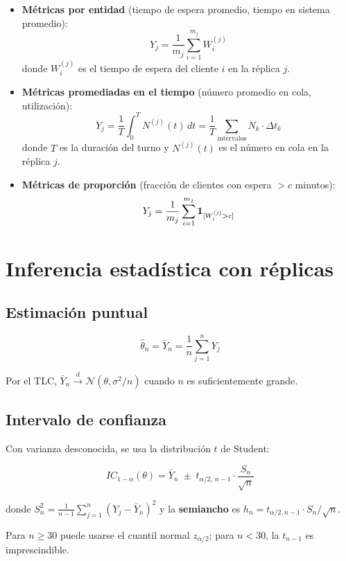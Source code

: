 \documentclass[11pt, letterpaper]{article}
\begin{document}
\begin{itemize}
    \item \textbf{Métricas por entidad} (tiempo de espera promedio, tiempo en sistema promedio):
    \[
    Y_j = \frac{1}{m_j}\sum_{i=1}^{m_j} W_i^{(j)}
    \]
    donde $W_i^{(j)}$ es el tiempo de espera del cliente $i$ en la réplica $j$.

    \item \textbf{Métricas promediadas en el tiempo} (número promedio en cola, utilización):
    \[
    Y_j = \frac{1}{T}\int_0^T N^{(j)}(t)\,dt = \frac{1}{T}\sum_{\text{intervalos}} N_k \cdot \Delta t_k
    \]
    donde $T$ es la duración del turno y $N^{(j)}(t)$ es el número en cola en la réplica $j$.

    \item \textbf{Métricas de proporción} (fracción de clientes con espera $> c$ minutos):
    \[
    Y_j = \frac{1}{m_j}\sum_{i=1}^{m_j}\mathbf{1}_{[W_i^{(j)} > c]}
    \]
\end{itemize}

\section{Inferencia estadística con réplicas}

\subsection{Estimación puntual}

\[
\hat\theta_n = \bar Y_n = \frac{1}{n}\sum_{j=1}^n Y_j
\]

Por el TLC, $\bar Y_n \xrightarrow{d} \mathcal{N}(\theta, \sigma^2/n)$ cuando $n$ es suficientemente grande.

\subsection{Intervalo de confianza}

Con varianza desconocida, se usa la distribución $t$ de Student:

\[
\boxed{IC_{1-\alpha}(\theta) = \bar Y_n \;\pm\; t_{\alpha/2,\,n-1}\cdot\frac{S_n}{\sqrt{n}}}
\]

donde $S_n^2 = \frac{1}{n-1}\sum_{j=1}^n(Y_j - \bar Y_n)^2$ y la \textbf{semiancho} es $h_n = t_{\alpha/2,n-1}\cdot S_n/\sqrt{n}$.

Para $n \ge 30$ puede usarse el cuantil normal $z_{\alpha/2}$; para $n < 30$, la $t_{n-1}$ es imprescindible.
\end{document}
